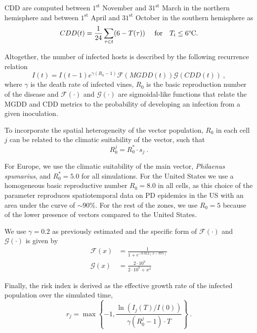 CDD are computed between $1^{\mathrm{st}}$ November and $31^{\mathrm{st}}$
March in the northern hemisphere and between $1^{\mathrm{st}}$ April and
$31^{\mathrm{st}}$ October in the southern hemisphere as
\begin{equation}
    CDD(t)= \frac{1}{24}\sum_{\tau \in t} (6-T(\tau)) \ \quad \textrm{for}
    \quad T_i\le 6\textrm{\textdegree C} .	\label{eq:CDDdef}
\end{equation}

Altogether, the number of infected hosts is described by the following
recurrence relation
\begin{equation}
    I(t)=I(t-1)e^{\gamma(R_0-1)}\mathcal{F}(MGDD(t))\mathcal{G}(CDD(t)) \ ,
\end{equation}
where $\gamma$ is the death rate of infected vines, $R_0$ is the basic
reproduction number of the disease and $\mathcal{F}(\cdot)$ and
$\mathcal{G}(\cdot)$ are sigmoidal-like functions that relate the MGDD and CDD
metrics to the probability of developing an infection from a given inoculation.

To incorporate the spatial heterogeneity of the vector population, $R_0$ in
each cell $j$ can be related to the climatic suitability of the vector, such
that
\begin{equation}
    R_0^j=R_0^*\cdot s_j \ .
\end{equation}

For Europe, we use the climatic suitability of the main vector,
\textit{Philaenus spumarius}, and $R_0^*=5.0$ for all simulations. For the
United States we use a homogeneous basic reproductive number $R_0=8.0$ in all
cells, as this choice of the parameter reproduces spatiotemporal data on PD
epidemics in the US with an area under the curve of $\sim 90\%$. For the rest
of the zones, we use $R_0=5$ because of the lower presence of vectors compared
to the United States.

We use $\gamma=0.2$ as previously estimated \cite{Almeida2003} and the
specific form of $\mathcal{F}(\cdot)$ and $\mathcal{G}(\cdot)$ is given by
\begin{align}
    \mathcal{F}(x) & = \frac{1}{1+e^{-0.012(x-975)}}        \\
    \mathcal{G}(x) & = \frac{2\cdot10^7}{2\cdot 10^7 + x^3}
\end{align}

Finally, the risk index is derived as the effective growth rate of the
infected population over the simulated time,
\begin{equation}
    r_j=\max\left\{-1, \frac{\ln(I_j(T) / I(0))}{\gamma(R_0^j-1)\cdot
        T}\right\} \ .
\end{equation}

